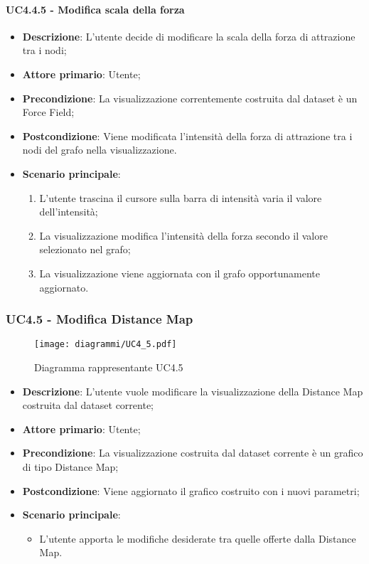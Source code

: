 \paragraph{UC4.4.5 - Modifica scala della forza}
\label{par:uc4.4.5}
\begin{itemize}
    \item \textbf{Descrizione}: L’utente decide di modificare la scala della forza di attrazione tra i nodi;


    \item \textbf{Attore primario}: Utente;

    \item \textbf{Precondizione}:   La visualizzazione correntemente costruita dal dataset è un Force Field;
    \item \textbf{Postcondizione}:  Viene modificata l'intensità della forza di attrazione tra i nodi del grafo nella visualizzazione.

	\item \textbf{Scenario principale}:
        \begin{enumerate}
            \item L'utente trascina il cursore sulla barra di intensità varia il valore dell’intensità;
            \item La visualizzazione modifica l'intensità della forza secondo il valore selezionato nel grafo;
            \item La visualizzazione viene aggiornata con il grafo opportunamente aggiornato.
        \end{enumerate}
\end{itemize}

\newpage
\subsubsection{UC4.5 - Modifica Distance Map}
\label{ssub:uc4.5}
\begin{figure}[h]
    \centering
    \texttt{[image: diagrammi/UC4\_5.pdf]}
    \caption{Diagramma rappresentante UC4.5}
    \label{fig:UC4.5}
\end{figure}

\begin{itemize}
    \item \textbf{Descrizione}: L'utente vuole modificare la visualizzazione della Distance Map costruita dal dataset corrente;
    \item \textbf{Attore primario}: Utente;
    \item \textbf{Precondizione}: La visualizzazione costruita dal dataset corrente è un grafico di tipo Distance Map;
    \item \textbf{Postcondizione}: Viene aggiornato il grafico costruito con i nuovi parametri;
    \item \textbf{Scenario principale}:
    \begin{itemize}
        \item L'utente apporta le modifiche desiderate tra quelle offerte dalla Distance Map.
    \end{itemize}
\end{itemize}

